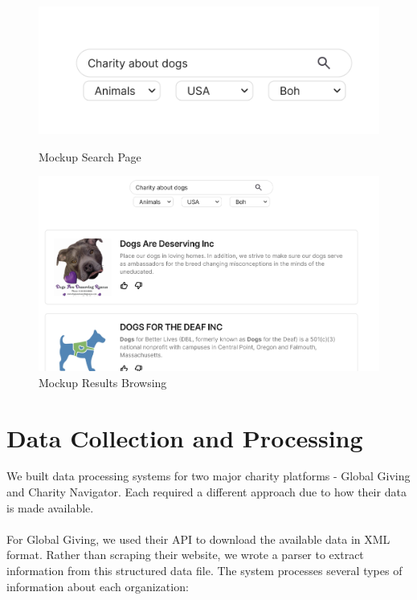 \documentclass[unicode,9pt,a4paper,oneside,numbers=endperiod,openany]{scrartcl}
\begin{document}
\begin{figure}[h]
    \centering
    \begin{minipage}{0.45\textwidth}
        \centering
        \includegraphics[width=\textwidth]{fig/mockup1.png}
        \caption{Mockup Search Page}
    \end{minipage}\hfill
    \begin{minipage}{0.45\textwidth}
        \centering
        \includegraphics[width=\textwidth]{fig/mockup2.png}
        \caption{Mockup Results Browsing}
    \end{minipage}
\end{figure}

\section{Data Collection and Processing}
We built data processing systems for two major charity platforms - Global Giving and Charity Navigator. Each required a different approach due to how their data is made available. \\
\hfill \\

For Global Giving, we used their API to download the available data in XML format. Rather than scraping their website, we wrote a parser to extract information from this structured data file. The system processes several types of information about each organization:
\end{document}
